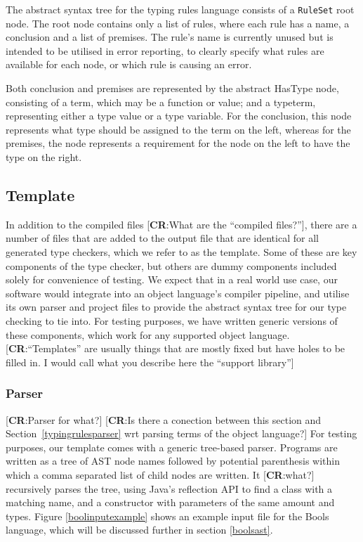 \documentclass[nofilelist]{cslthse-msc}
\newcommand{\CR}[1]{\textcolor{green!60!black}{[\textbf{CR}:#1]}}
\begin{document}
The abstract syntax tree for the typing rules language consists of a \lstinline{RuleSet} root node.
The root node contains only a list of rules, where each rule has a name, a conclusion and a list of premises.
The rule's name is currently unused but is intended to be utilised in error reporting, to clearly specify what rules are available for each node, or which rule is causing an error.

Both conclusion and premises are represented by the abstract HasType node, consisting of a term, which may be a function or value; and a typeterm, representing either a type value or a type variable.
For the conclusion, this node represents what type should be assigned to the term on the left, whereas for the premises, the node represents a requirement for the node on the left to have the type on the right.

\subsection{Template}
In addition to the compiled files \CR{What are the ``compiled files?''}, there are a number of files that are added to the output file that are identical for all generated type checkers, which we refer to as the template.
Some of these are key components of the type checker, but others are dummy components included solely for convenience of testing.
We expect that in a real world use case, our software would integrate into an object language's compiler pipeline, and utilise its own parser and project files to provide the abstract syntax tree for our type checking to tie into.
For testing purposes, we have written generic versions of these components, which work for any supported object language.
\CR{``Templates'' are usually things that are mostly fixed but have holes to be filled in.  I would call what you describe here the ``support library''}

\subsubsection{Parser}\label{treebasedparser}
\CR{Parser for what?}
\CR{Is there a conection between this section and Section~\ref{typingrulesparser} wrt parsing terms of the object language?}
For testing purposes, our template comes with a generic tree-based parser.
Programs are written as a tree of AST node names followed by potential parenthesis within which a comma separated list of child nodes are written.
It \CR{what?} recursively parses the tree, using Java's reflection API to find a class with a matching name, and a constructor with parameters of the same amount and types.
Figure \ref{boolinputexample} shows an example input file for the Bools language, which will be discussed further in section \ref{boolsast}.
\end{document}
